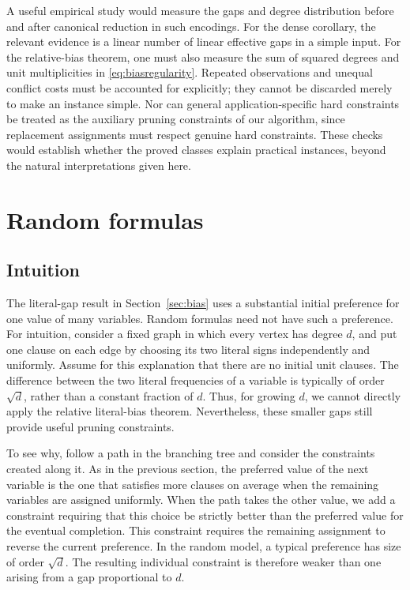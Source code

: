 \documentclass[11pt,a4paper]{article}
\theoremstyle{definition}
\theoremstyle{remark}
\begin{document}
A useful empirical study would measure the gaps and degree distribution
before and after canonical reduction in such encodings. For the dense
corollary, the relevant evidence is a linear number of linear effective
gaps in a simple input. For the relative-bias theorem, one must also measure
the sum of squared degrees and unit multiplicities in
\eqref{eq:biasregularity}. Repeated observations and unequal conflict costs
must be accounted for explicitly; they cannot be discarded merely to make
an instance simple. Nor can general application-specific hard constraints
be treated as the auxiliary pruning constraints of our algorithm, since
replacement assignments must respect genuine hard constraints. These checks
would establish whether the proved classes explain practical instances,
beyond the natural interpretations given here.

\section{Random formulas}\label{sec:random}

\subsection{Intuition}\label{sec:random_intuition}

The literal-gap result in Section~\ref{sec:bias} uses a substantial initial
preference for one value of many variables. Random formulas need not have
such a preference. For intuition, consider a fixed graph in which every
vertex has degree $d$, and put one clause on each edge by choosing its two
literal signs independently and uniformly. Assume for this explanation
that there are no initial unit clauses. The difference between the two
literal frequencies of a variable is typically of order $\sqrt d$, rather
than a constant fraction of $d$. Thus, for growing $d$, we cannot directly
apply the relative literal-bias theorem. Nevertheless, these smaller gaps
still provide useful pruning constraints.

To see why, follow a path in the branching tree and consider the constraints
created along it. As in the previous section, the preferred value of the
next variable is the one that satisfies more clauses on average when the
remaining variables are assigned uniformly. When the path takes the other
value, we add a constraint requiring that this choice be strictly better
than the preferred value for the eventual completion. This constraint
requires the remaining assignment to reverse the current preference.
In the random model, a typical preference has size of order $\sqrt d$.
The resulting individual constraint is therefore weaker than one arising
from a gap proportional to $d$.
\end{document}
